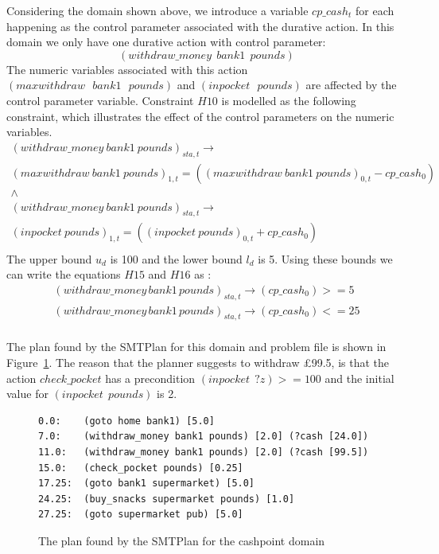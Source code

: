 Considering the domain shown above, we introduce a variable $cp\_cash_t$ for each happening as the control parameter associated with the durative action. In this domain we only have one durative action with control parameter:
$$
(withdraw\_money \ \  bank1 \ \  pounds)
$$
The numeric variables associated with this action $(maxwithdraw \ \ \ bank1 \ \ \ pounds)$ and  $(inpocket \ \ \ pounds)$ are affected by the control parameter variable. Constraint $H10$ is modelled as the following constraint, which illustrates the effect of the control parameters on the numeric variables.
$$
\begin{array}{c}
(withdraw\_money\ bank1\ pounds)_{sta,t}  \rightarrow \\
(maxwithdraw\ bank1\ pounds)_{1,t} = ((maxwithdraw\ bank1\ pounds)_{0,t} - cp\_cash_0) \\
\wedge \\
(withdraw\_money\ bank1\ pounds)_{sta,t}  \rightarrow \\
(inpocket\ pounds)_{1,t} = ((inpocket\ pounds)_{0,t} + cp\_cash_0) \\
\end{array}
$$
The upper bound $u_d$ is 100 and the lower bound $l_d$ is 5. Using these bounds we can write the equations $H15$ and $H16$ as :
$$
\begin{array}{l}
(withdraw\_money \, bank1 \, pounds)_{sta,t}  \rightarrow (cp\_cash_0) >=  5 \\
(withdraw\_money \, bank1 \, pounds)_{sta,t}  \rightarrow (cp\_cash_0) <=  25  \\
\end{array}
$$

The plan found by the SMTPlan for this domain and problem file is shown in Figure~\ref{fig:cashpoint plan}. The reason that the planner suggests to withdraw \pounds99.5, is that the action $check\_pocket$ has a precondition $(inpocket \ \ ?z) >= 100$ and the initial value for $(inpocket \ \ pounds)$ is 2.

\begin{figure}[thb]
\small
\begin{verbatim}
0.0:	(goto home bank1) [5.0]
7.0:	(withdraw_money bank1 pounds) [2.0] (?cash [24.0])
11.0:	(withdraw_money bank1 pounds) [2.0] (?cash [99.5])
15.0:	(check_pocket pounds) [0.25]
17.25:	(goto bank1 supermarket) [5.0]
24.25:	(buy_snacks supermarket pounds) [1.0]
27.25:	(goto supermarket pub) [5.0]
\end{verbatim}
\caption{The plan found by the SMTPlan for the cashpoint domain}
\label{fig:cashpoint plan}
\end{figure}

